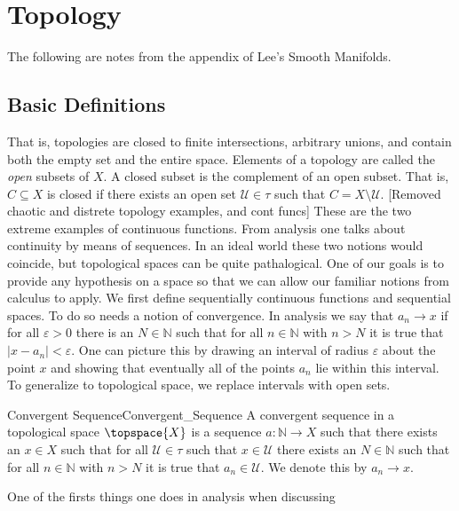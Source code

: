 \section{Topology}
    The following are notes from the appendix of Lee's Smooth Manifolds.
    \subsection{Basic Definitions}
        That is, topologies are closed to finite intersections, arbitrary
        unions, and contain both the empty set and the entire space.
        Elements of a topology are called the \textit{open} subsets of $X$.
        A closed subset is the complement of an open subset. That is,
        $C\subseteq{X}$ is closed if there exists an open set
        $\mathcal{U}\in\tau$ such that $C=X\setminus\mathcal{U}$.
        [Removed chaotic and distrete topology examples, and cont funcs]
        These are the two extreme examples of continuous functions. From
        analysis one talks about continuity by means of sequences. In an
        ideal world these two notions would coincide, but topological spaces
        can be quite pathalogical. One of our goals is to provide any
        hypothesis on a space so that we can allow our familiar notions from
        calculus to apply. We first define sequentially continuous functions
        and sequential spaces. To do so needs a notion of convergence. In
        analysis we say that $a_{n}\rightarrow{x}$ if for all
        $\varepsilon>0$ there is an $N\in\mathbb{N}$ such that for all
        $n\in\mathbb{N}$ with $n>N$ it is true that $|x-a_{n}|<\varepsilon$.
        One can picture this by drawing an interval of radius $\varepsilon$
        about the point $x$ and showing that eventually all of the points
        $a_{n}$ lie within this interval. To generalize to topological
        space, we replace intervals with open sets.
        \begin{fdefinition}{Convergent Sequence}{Convergent_Sequence}
            A convergent sequence in a topological space $\topspace{X}$ is a
            sequence $a:\mathbb{N}\rightarrow{X}$ such that there exists an
            $x\in{X}$ such that for all $\mathcal{U}\in\tau$ such that
            $x\in\mathcal{U}$ there exists an $N\in\mathbb{N}$ such that for
            all $n\in\mathbb{N}$ with $n>N$ it is true that
            $a_{n}\in\mathcal{U}$. We denote this by $a_{n}\rightarrow{x}$.
        \end{fdefinition}
        One of the firsts things one does in analysis when discussing
